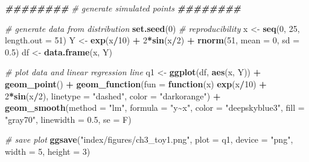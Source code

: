 \documentclass[12pt, twoside]{amherstthesis}
\newenvironment{Shaded}{\begin{snugshade}}{\end{snugshade}}
\newcommand{\AttributeTok}[1]{\textcolor[rgb]{0.13,0.29,0.53}{#1}}
\newcommand{\CommentTok}[1]{\textcolor[rgb]{0.56,0.35,0.01}{\textit{#1}}}
\newcommand{\ControlFlowTok}[1]{\textcolor[rgb]{0.13,0.29,0.53}{\textbf{#1}}}
\newcommand{\DecValTok}[1]{\textcolor[rgb]{0.00,0.00,0.81}{#1}}
\newcommand{\DocumentationTok}[1]{\textcolor[rgb]{0.56,0.35,0.01}{\textbf{\textit{#1}}}}
\newcommand{\FloatTok}[1]{\textcolor[rgb]{0.00,0.00,0.81}{#1}}
\newcommand{\FunctionTok}[1]{\textcolor[rgb]{0.13,0.29,0.53}{\textbf{#1}}}
\newcommand{\NormalTok}[1]{#1}
\newcommand{\OtherTok}[1]{\textcolor[rgb]{0.56,0.35,0.01}{#1}}
\newcommand{\SpecialCharTok}[1]{\textcolor[rgb]{0.81,0.36,0.00}{\textbf{#1}}}
\newcommand{\StringTok}[1]{\textcolor[rgb]{0.31,0.60,0.02}{#1}}
\begin{document}
\begin{Shaded}
\begin{Highlighting}[]
\DocumentationTok{\#\#\#\#\#\#\#\#}
\CommentTok{\# generate simulated points}
\DocumentationTok{\#\#\#\#\#\#\#\#}

\CommentTok{\# generate data from distribution}
\FunctionTok{set.seed}\NormalTok{(}\DecValTok{0}\NormalTok{) }\CommentTok{\# reproducibility}
\NormalTok{x }\OtherTok{\textless{}{-}} \FunctionTok{seq}\NormalTok{(}\DecValTok{0}\NormalTok{, }\DecValTok{25}\NormalTok{, }\AttributeTok{length.out =} \DecValTok{51}\NormalTok{)}
\NormalTok{Y }\OtherTok{\textless{}{-}} \FunctionTok{exp}\NormalTok{(x}\SpecialCharTok{/}\DecValTok{10}\NormalTok{) }\SpecialCharTok{+} \DecValTok{2}\SpecialCharTok{*}\FunctionTok{sin}\NormalTok{(x}\SpecialCharTok{/}\DecValTok{2}\NormalTok{) }\SpecialCharTok{+} \FunctionTok{rnorm}\NormalTok{(}\DecValTok{51}\NormalTok{, }\AttributeTok{mean =} \DecValTok{0}\NormalTok{, }\AttributeTok{sd =} \FloatTok{0.5}\NormalTok{)}
\NormalTok{df }\OtherTok{\textless{}{-}} \FunctionTok{data.frame}\NormalTok{(x, Y)}

\CommentTok{\# plot data and linear regression line}
\NormalTok{q1 }\OtherTok{\textless{}{-}} \FunctionTok{ggplot}\NormalTok{(df, }\FunctionTok{aes}\NormalTok{(x, Y)) }\SpecialCharTok{+}
  \FunctionTok{geom\_point}\NormalTok{() }\SpecialCharTok{+}
  \FunctionTok{geom\_function}\NormalTok{(}\AttributeTok{fun =} \ControlFlowTok{function}\NormalTok{(x) }\FunctionTok{exp}\NormalTok{(x}\SpecialCharTok{/}\DecValTok{10}\NormalTok{) }\SpecialCharTok{+} \DecValTok{2}\SpecialCharTok{*}\FunctionTok{sin}\NormalTok{(x}\SpecialCharTok{/}\DecValTok{2}\NormalTok{), }
                \AttributeTok{linetype =} \StringTok{"dashed"}\NormalTok{, }\AttributeTok{color =} \StringTok{"darkorange"}\NormalTok{) }\SpecialCharTok{+} 
  \FunctionTok{geom\_smooth}\NormalTok{(}\AttributeTok{method =} \StringTok{"lm"}\NormalTok{, }\AttributeTok{formula =} \StringTok{"y\textasciitilde{}x"}\NormalTok{, }
              \AttributeTok{color =} \StringTok{"deepskyblue3"}\NormalTok{, }\AttributeTok{fill =} \StringTok{"gray70"}\NormalTok{, }
              \AttributeTok{linewidth =} \FloatTok{0.5}\NormalTok{, }\AttributeTok{se =}\NormalTok{ F)}

\CommentTok{\# save plot}
\FunctionTok{ggsave}\NormalTok{(}\StringTok{"index/figures/ch3\_toy1.png"}\NormalTok{, }\AttributeTok{plot =}\NormalTok{ q1, }\AttributeTok{device =} \StringTok{"png"}\NormalTok{, }
       \AttributeTok{width =} \DecValTok{5}\NormalTok{, }\AttributeTok{height =} \DecValTok{3}\NormalTok{)}
\end{Highlighting}
\end{Shaded}
\end{document}
